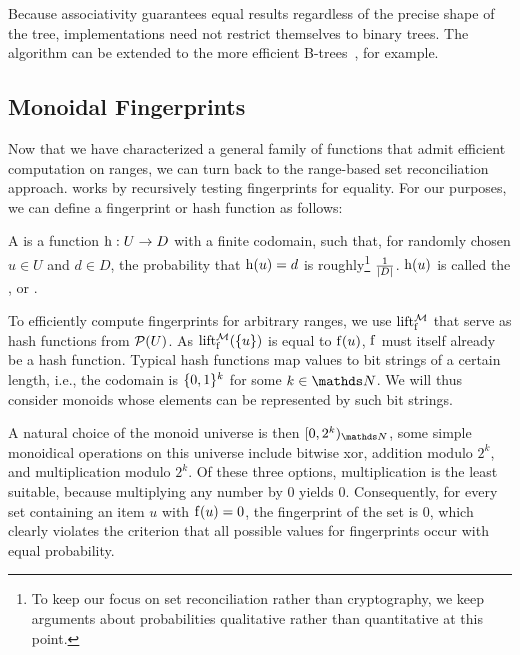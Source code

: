 \documentclass[conference]{IEEEtran}
\begin{document}
Because associativity guarantees equal results regardless of the precise shape of the tree, implementations need not restrict themselves to binary trees. The algorithm can be extended to the more efficient B-trees~\cite{bayer2002organization}, for example.

\subsection{Monoidal Fingerprints}

Now that we have characterized a general family of functions that admit efficient computation on ranges, we can turn back to the range-based set reconciliation approach.  works by recursively testing fingerprints for equality. For our purposes,
we can define a fingerprint or hash function as follows:

\begin{definition}
A  is a function ${\operatorname{h}}: {U} \rightarrow {D}$ with a finite codomain, such that, for randomly chosen $u \in U$ and $d \in D$, the probability that $\operatorname{h}(u) = d$ is roughly\footnote{To keep our focus on set reconciliation rather than cryptography, we keep arguments about probabilities qualitative rather than quantitative at this point.} $\frac{1}{|{D}|}$. $\operatorname{h}(u)$ is called the ,  or .
\end{definition}

To efficiently compute fingerprints for arbitrary ranges, we use \somewhatmorphisms{} $\operatorname{lift_{\operatorname{f}}^{\mathcal{M}}}$ that serve as hash functions from $\mathcal{P}({U})$. As $\operatorname{lift_{\operatorname{f}}^{\mathcal{M}}}(\{u\})$ is equal to $\operatorname{f}(u)$, $\operatorname{f}$ must itself already be a hash function. Typical hash functions map values to bit strings of a certain length, i.e., the codomain is $\{0, 1\}^k$ for some $k \in \N$. We will thus consider monoids whose elements can be represented by such bit strings.

A natural choice of the monoid universe is then $\range{0}{2^k}{\N}$, some simple monoidical operations on this universe include bitwise xor, addition modulo $2^k$, and multiplication modulo $2^k$. Of these three options, multiplication is the least suitable, because multiplying any number by $0$ yields $0$. Consequently, for every set containing an item $u$ with $\operatorname{f}(u) = 0$, the fingerprint of the set is $0$, which clearly violates the criterion that all possible values for fingerprints occur with equal probability.
\end{document}
